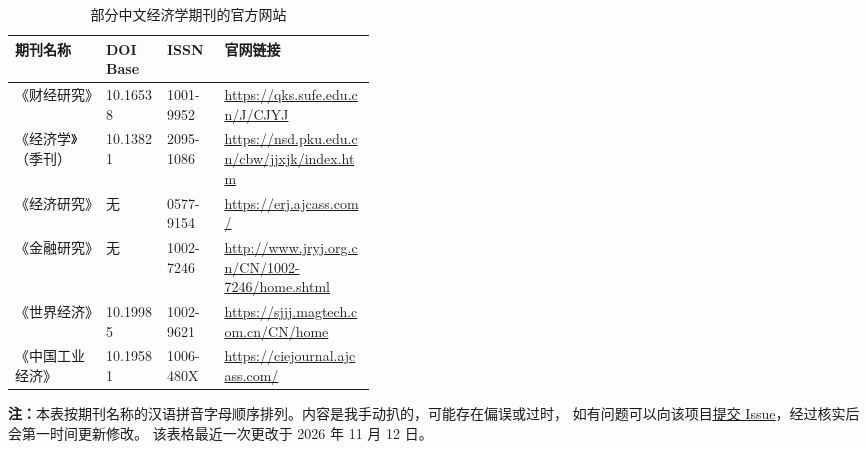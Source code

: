 \begin{table}[htbp]
    \centering
    \caption{部分中文经济学期刊的官方网站}
    \label{tab:journals}
    \setlength{\tabcolsep}{4pt}
    \begin{tabular}{@{}l l l p{0.42\linewidth}@{}}
        \toprule
        \textbf{期刊名称} & \textbf{DOI Base} & \textbf{ISSN} & \textbf{官网链接} \\
        \midrule
        《财经研究》 & 10.16538 & 1001-9952 & \url{https://qks.sufe.edu.cn/J/CJYJ} \\
        《经济学》（季刊） & 10.13821 & 2095-1086 & \url{https://nsd.pku.edu.cn/cbw/jjxjk/index.htm} \\
        《经济研究》 & 无 & 0577-9154 & \url{https://erj.ajcass.com/} \\
        《金融研究》 & 无 & 1002-7246 & \url{http://www.jryj.org.cn/CN/1002-7246/home.shtml} \\
        《世界经济》 & 10.19985 & 1002-9621 & \url{https://sjjj.magtech.com.cn/CN/home} \\
        《中国工业经济》 & 10.19581 & 1006-480X & \url{https://ciejournal.ajcass.com/} \\
        \bottomrule
    \end{tabular}
    \par\smallskip
    {\footnotesize\raggedright
    \textbf{注：}本表按期刊名称的汉语拼音字母顺序排列。内容是我手动扒的，可能存在偏误或过时，
    如有问题可以向该项目\href{https://github.com/aidea-labs/econ-sbm-template/issues/new}{\underline{提交 Issue}}，经过核实后会第一时间更新修改。
    该表格最近一次更改于 2026 年 11 月 12 日。\par}
\end{table}

